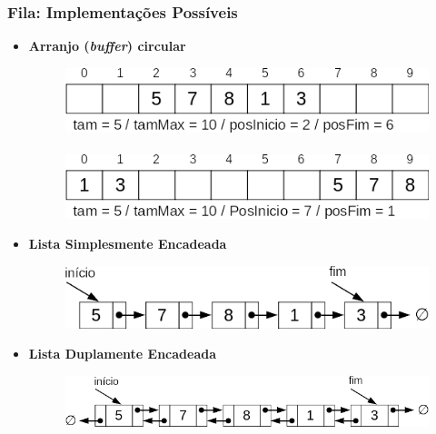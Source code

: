 \documentclass[aspectratio=169]{beamer}
\begin{document}
\begin{frame}\frametitle{Fila: Implementações Possíveis}
\begin{itemize}
	\item \textbf{Arranjo (\emph{buffer}) circular}
\begin{figure}[h]
	\flushleft
	\includegraphics[height=0.13\paperheight]{imagens/fila1a.png} ~ ~ ~ \includegraphics[height=0.13\paperheight]{imagens/fila1b.png}
\end{figure}
	\item \textbf{Lista Simplesmente Encadeada}
\begin{figure}[h]
	\flushleft
	\includegraphics[height=0.15\paperheight]{imagens/fila2.png}
\end{figure}
	\item \textbf{Lista Duplamente Encadeada}
\begin{figure}[h]
	\flushleft
	\includegraphics[height=0.15\paperheight]{imagens/fila3.png}
\end{figure}
\end{itemize}
\end{frame}
\end{document}
